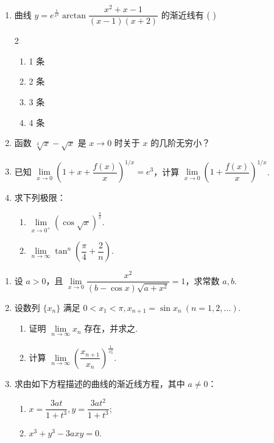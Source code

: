 \newpage

\begin{enumerate}[label=\textbf{\arabic*.}, itemsep=4.5cm, resume]
    \item 曲线 $y = e^{\frac{1}{x^2}} \arctan \dfrac{x^2 + x - 1}{(x-1)(x+2)}$ 的渐近线有 ( \quad )
    \begin{multicols}{2}
    \begin{enumerate}[label=(\Alph*)]
        \item 1 条
        \item 2 条
        \item 3 条
        \item 4 条
    \end{enumerate}
    \end{multicols}

    \item 函数 $\sqrt[3]{x} - \sqrt{x}$ 是 $x \to 0$ 时关于 $x$ 的几阶无穷小？

    \item 已知 $\lim\limits_{x \to 0} \left( 1 + x + \dfrac{f(x)}{x} \right)^{1/x} = e^3$，计算 $\lim\limits_{x \to 0} \left( 1 + \dfrac{f(x)}{x} \right)^{1/x}$.

    \item 求下列极限：
    \begin{enumerate}[label=(\arabic*), itemsep=2cm]
        \item $\lim\limits_{x \to 0^+} (\cos \sqrt{x})^{\frac{\pi}{x}}$.
        \item $\lim\limits_{n \to \infty} \tan^n \left( \dfrac{\pi}{4} + \dfrac{2}{n} \right)$.
    \end{enumerate}
\end{enumerate}

\newpage

\begin{enumerate}[label=\textbf{\arabic*.}, itemsep=4.5cm, resume]
    \item 设 $a > 0$，且 $\lim\limits_{x \to 0} \dfrac{x^2}{(b - \cos x)\sqrt{a+x^2}} = 1$，求常数 $a, b$.

    \item 设数列 $\{x_n\}$ 满足 $0 < x_1 < \pi, x_{n+1} = \sin x_n \ (n = 1, 2, \dots)$.
    \begin{enumerate}[label=(\arabic*), itemsep=3cm]
        \item 证明 $\lim\limits_{n \to \infty} x_n$ 存在，并求之.
        \item 计算 $\lim\limits_{n \to \infty} \left( \dfrac{x_{n+1}}{x_n} \right)^{\frac{1}{x_n^2}}$.
    \end{enumerate}

    \item 求由如下方程描述的曲线的渐近线方程，其中 $a \ne 0$：
    \begin{enumerate}[label=(\arabic*), itemsep=3cm]
        \item $x = \dfrac{3at}{1+t^3}, y = \dfrac{3at^2}{1+t^3}$;
        \item $x^3 + y^3 - 3axy = 0$.
    \end{enumerate}
\end{enumerate}

